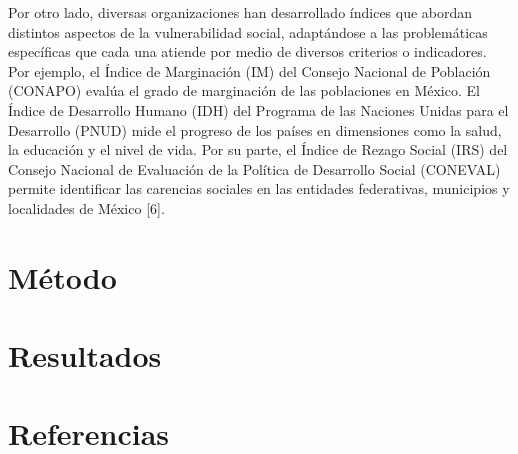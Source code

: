 \documentclass[
  letterpaper,
  DIV=11,
  numbers=noendperiod]{scrreprt}
\begin{document}
Por otro lado, diversas organizaciones han desarrollado índices que
abordan distintos aspectos de la vulnerabilidad social, adaptándose a
las problemáticas específicas que cada una atiende por medio de diversos
criterios o indicadores. Por ejemplo, el Índice de Marginación (IM) del
Consejo Nacional de Población (CONAPO) evalúa el grado de marginación de
las poblaciones en México. El Índice de Desarrollo Humano (IDH) del
Programa de las Naciones Unidas para el Desarrollo (PNUD) mide el
progreso de los países en dimensiones como la salud, la educación y el
nivel de vida. Por su parte, el Índice de Rezago Social (IRS) del
Consejo Nacional de Evaluación de la Política de Desarrollo Social
(CONEVAL) permite identificar las carencias sociales en las entidades
federativas, municipios y localidades de México {[}6{]}.


\chapter{Método}\label{muxe9todo}


\chapter{Resultados}\label{resultados}


\chapter*{Referencias}\label{referencias}

\end{document}
